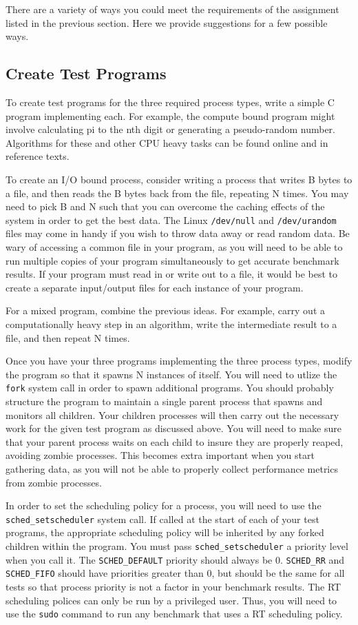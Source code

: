 \documentclass[12pt]{article}
\begin{document}
There are a variety of ways you could meet the requirements of the
assignment listed in the previous section. Here we provide suggestions
for a few possible ways.

\subsection{Create Test Programs}

To create test programs for the three required process types,
write a simple C program implementing
each. For example, the compute bound program might involve
calculating pi to the nth digit or generating a pseudo-random number.
Algorithms for these and other CPU
heavy tasks can be found online and in reference texts.

To create an
I/O bound process, consider writing a process that writes B bytes to a
file, and then reads the B bytes back from the file, repeating N
times. You may need to pick B and N such that you can overcome the
caching effects of the system in order to get the best data. The Linux
\texttt{/dev/null} and \texttt{/dev/urandom} files may come in handy
if you wish to throw data away or read random data. Be wary of
accessing a common file in your program, as you will need to be
able to run multiple copies of your program simultaneously to get
accurate benchmark results. If your program must read in or write out
to a file, it would be best to create a separate input/output files for
each instance of your program.

For a mixed program, combine the previous ideas. For example, carry out a
computationally heavy step in an algorithm, write the intermediate
result to a file, and then repeat N times.

Once you have your three programs implementing the three process types,
modify the program so that it spawns N instances of itself. You will
need to utlize the \texttt{fork} system call in order to spawn
additional programs. You should probably structure the program to
maintain a single parent process that spawns and monitors all
children. Your children processes will then carry out the necessary
work for the given test program as discussed above.
You will need to make sure that your parent process waits on
each child to insure they are properly reaped, avoiding zombie
processes. This becomes extra important when you start gathering data,
as you will not be able to properly collect performance metrics from
zombie processes. 

In order to set the scheduling policy for a process, you will need to
use the \texttt{sched\_setscheduler} system call. If called at the start
of each of your test programs, the appropriate scheduling policy
will be inherited by any forked children within the program. You must pass
\texttt{sched\_setscheduler} a priority level when you call it.
The \texttt{SCHED\_DEFAULT} priority should always be
0. \texttt{SCHED\_RR} and \texttt{SCHED\_FIFO} should have priorities
greater than 0, but should be the same for all tests so that process
priority is not a factor in your benchmark results. The RT scheduling
polices can only be run by a privileged user. Thus, you will need to
use the \texttt{sudo} command to run any benchmark that uses a RT
scheduling policy.
\end{document}
